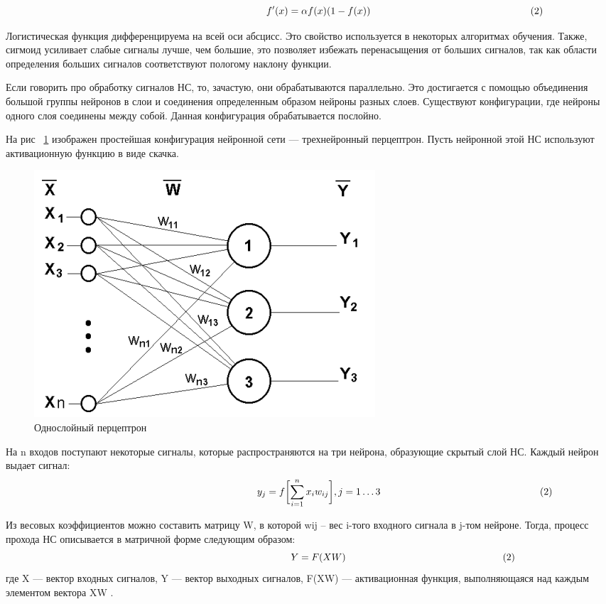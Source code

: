 \documentclass[a4paper,english,russian]{G2-105}
\begin{document}
\[
\ \hspace*{66mm} f'(x) = \alpha f(x) (1 - f(x)) \ \hspace*{56mm} (2)
\] 
\par Логистическая функция дифференцируема на всей оси абсцисс. Это свойство используется в некоторых алгоритмах обучения. Также, сигмоид усиливает слабые сигналы лучше, чем большие, это позволяет избежать перенасыщения от больших сигналов, так как области определения больших сигналов соответствуют пологому наклону функции.   
\par Если говорить про обработку сигналов НС, то, зачастую, они обрабатываются параллельно. Это достигается с помощью объединения большой группы нейронов в слои и соединения определенным образом нейроны разных слоев. Существуют конфигурации, где нейроны одного слоя соединены между собой. Данная конфигурация обрабатывается послойно.
\par На рис ~\ref{perceptron} изображен простейшая конфигурация нейронной сети --- трехнейронный перцептрон. Пусть нейронной этой НС используют активационную функцию в виде скачка. 
\begin{figure}
    \includegraphics[width=0.4\linewidth]{perceptron.png}
    \caption{Однослойный перцептрон}
	\label{perceptron}
\end{figure}
\par На n входов поступают некоторые сигналы, которые распространяются на три нейрона, образующие скрытый слой НС. Каждый нейрон выдает сигнал:
\[
\ \hspace*{66mm} y_j = f\biggl[\sum_{i=1}^n x_i w_{ij} \biggr], j=1 \dots 3  \ \hspace*{56mm} (2)
\] 
\par Из весовых коэффициентов можно составить матрицу W, в которой wij -- вес i-того входного сигнала в j-том нейроне. Тогда, процесс прохода НС описывается в матричной форме следующим образом:
\[
\ \hspace*{66mm} Y=F(XW)  \ \hspace*{56mm} (2)
\] 
где X --- вектор входных сигналов, Y --- вектор выходных сигналов, F(XW) --- активационная функция, выполняющаяся над каждым элементом вектора XW \cite{12}.
\end{document}
